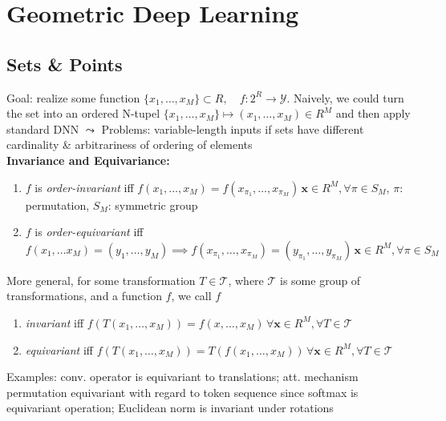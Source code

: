 \section{Geometric Deep Learning}
\subsection{Sets \& Points}
Goal: realize some function \(\{x_1,\ldots, x_M\}\subset R,\quad f:2^R\rightarrow \mathcal{Y}\). 
Naively, we could turn the set into an ordered N-tupel \(\{x_1, \ldots, x_M\} \mapsto (x_1,\ldots, x_M)\in R^M\) and then apply standard DNN \(\leadsto\) Problems: variable-length inputs if sets have different cardinality \& arbitrariness of ordering of elements\\
\textbf{Invariance and Equivariance:} 
\begin{enumerate}
    \item \(f\) is \textit{order-invariant} iff \(f(x_1, \ldots, x_M)=f(x_{\pi_1}, \ldots, x_{\pi_M})\, \bm{x}\in R^M,\forall \pi \in S_M\), \(\pi:\) permutation, \(S_M\): symmetric group
    \item \(f\) is \textit{order-equivariant} iff \(f(x_1,\ldots x_M)=(y_1,\ldots, y_M)\implies f(x_{\pi_1},\ldots, x_{\pi_M})=(y_{\pi_1},\ldots, y_{\pi_M})\, \bm{x}\in R^M,\forall \pi\in S_M\)
\end{enumerate}
More general, for some transformation \(T\in \mathcal{T}\), where \(\mathcal{T}\) is some group of transformations, and a function \(f\), we call \(f\)
\begin{enumerate}
    \item \textit{invariant} iff \(f(T(x_1,\ldots, x_M))=f(x,\ldots, x_M)\, \forall \bm{x}\in R^M,\forall T\in \mathcal{T}\)
    \item \textit{equivariant} iff \(f(T(x_1,\ldots, x_M))=T(f(x_1, \ldots, x_M))\, \forall \bm{x}\in R^M, \forall T\in \mathcal{T}\)
\end{enumerate}
Examples: conv. operator is equivariant to translations; att. mechanism permutation equivariant with regard to token sequence since softmax is equivariant operation; Euclidean norm is invariant under rotations

